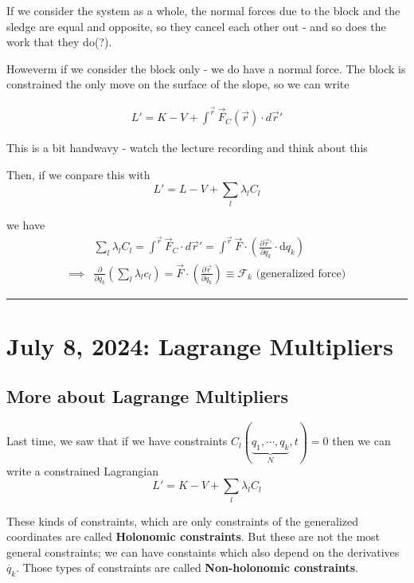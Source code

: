 \documentclass[11pt]{article}
\begin{document}
If we consider the system as a whole, the normal forces due to the block and the sledge are equal and opposite, so they cancel each other out - and so does the work that they do(?).

\vskip 0.5cm
Howeverm if we consider the block only - we do have a normal force. The block is constrained the only move on the surface of the slope, so we can write 

\begin{align*}
  L' = K - V + \int^{\vec{r}} \vec{F}_C(\vec{r}) \cdot d\vec{r}'
\end{align*}

\begin{thought}
  {This is a bit handwavy - watch the lecture recording and think about this}
\end{thought}

Then, if we conpare this with 
\[ L' = L - V + \sum_{l} \lambda_l C_l \]

we have 
\begin{align*}
  &\sum_{l} \lambda_l C_l = \int^{\vec{r}} \vec{F}_C \cdot d\vec{r}' = \int^{\vec{r}} \vec{F} \cdot \left( \frac{\partial \vec{r}'}{\partial q_k} \cdot \mathrm{d}q_k \right) \\
  \implies& \frac{\partial}{\partial q_k} \left( \sum_{l} \lambda_l c_l \right) = \vec{F} \cdot \left( \frac{\partial \vec{r}}{\partial q_{k}} \right) \equiv \mathcal{F}_k \text{  (generalized force)}
\end{align*}

\hrule

\pagebreak
\section{July 8, 2024: Lagrange Multipliers}

\vskip 0.5cm
\subsection{More about Lagrange Multipliers}
Last time, we saw that if we have constraints $C_l \left(\underbrace{q_1, \cdots, q_k}_{N}, t\right) = 0$ then we can write a constrained Lagrangian
\[ L' = K - V + \sum_{l} \lambda_l C_l \]

These kinds of constraints, which are only constraints of the generalized coordinates are called \textbf{Holonomic constraints}. But these are not the most general constraints; we can have constaints which also depend on the derivatives $\dot{q_{k}}$. Those types of constraints are called \textbf{Non-holonomic constraints}.
\end{document}
